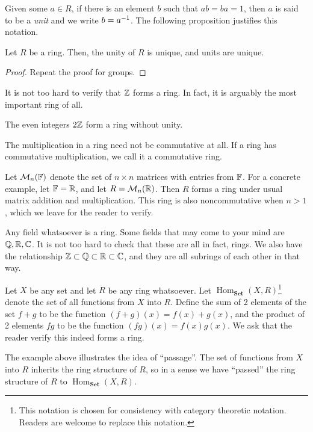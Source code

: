 \documentclass[./main.tex]{subfiles}
\begin{document}
Given some $a \in R$, if there is an element $b$ such that $ab = ba = 1$, then
$a$ is said to be a \emph{unit} and we write $b = a^{-1}$. The following
proposition justifies this notation.

\begin{proposition}
    Let $R$ be a ring. Then, the unity of $R$ is unique, and units are unique.
\end{proposition}
\begin{proof}
    Repeat the proof for groups.
\end{proof}

\begin{example}
    It is not too hard to verify that $\mathbb{Z}$ forms a ring. In fact, it is
    arguably the most important ring of all.
\end{example}

\begin{example}
    The even integers $2 \mathbb{Z}$ form a ring without unity.
\end{example}


The multiplication in a ring need not be commutative at all. If a ring has
commutative multiplication, we call it a commutative ring.
\begin{example}
    Let $\mathcal{M}_n(\mathbb{F})$ denote the set of $n \times n$ matrices with entries
    from $\mathbb{F}$. For a concrete example, let $\mathbb{F} = \mathbb{R}$, and let $R = \mathcal{M}_n(\mathbb{R})$. Then $R$ forms a ring under usual matrix addition and
    multiplication. This ring is also noncommutative when $n > 1$, which we
    leave for the reader to verify.
\end{example}

\begin{example}
    Any field whatsoever is a ring. Some fields that may come to your mind are
    $\mathbb{Q}, \mathbb{R}, \mathbb{C}$. It is not too hard to check that these are all in fact,
    rings. We also have the relationship $\mathbb{Z} \subset \mathbb{Q} \subset \mathbb{R} \subset
    \mathbb{C}$, and they are all subrings of each other in that way.
\end{example}

\begin{example}
    Let $X$ be any set and let $R$ be any ring whatsoever. Let
    $\operatorname{Hom}_{\mathbf{Set}}(X, R)$\footnote{This notation is chosen
    for consistency with category theoretic notation. Readers are welcome to
    replace this notation.} denote the set of all functions from $X$ into $R$.
    Define the sum of 2 elements of the set $f+g$ to be the function $(f+g)(x) =
    f(x) + g(x)$, and the product of 2 elements $fg$ to be the function $(fg)(x)
    = f(x) g(x)$. We ask that the reader verify this indeed forms a ring. 
\end{example}
The example above illustrates the idea of ``passage''. The set of functions from
$X$ into $R$ inherits the ring structure of $R$, so in a sense we have
``passed'' the ring structure of $R$ to $\operatorname{Hom}_{\mathbf{Set}}(X, R)$. 
\end{document}
